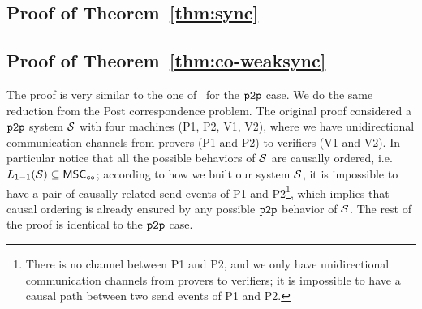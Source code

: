 \subsection{Proof of Theorem~\ref{thm:sync}}
\label{apx:sync}



\subsection{Proof of Theorem~\ref{thm:co-weaksync}}
\label{apx:thm-co-weak-sync}

\thmCoWeakSync*


The proof is very similar to the one of~\cite[Theorem~20]{BolligGFLLS21-long} for the $\mathtt{p2p}$ case. 
We do the same reduction from the Post correspondence problem. 
The original proof considered a $\mathtt{p2p}$ system $\mathcal{S}$ with four machines (P1, P2, V1, V2), where we have 
unidirectional communication channels from provers (P1 and P2) to verifiers (V1 and V2). In particular notice 
that all the possible behaviors of $\mathcal{S}$ are causally ordered, i.e. $L_{1\mathsf{-}1}(\mathcal{S}) \subseteq \mathsf{MSC}_{\mathtt{co}}$; 
according to how we built our system $\mathcal{S}$, it is impossible to have a pair of causally-related send 
events of P1 and P2\footnote{There is no channel between P1 and P2, and we only have unidirectional communication 
channels from provers to verifiers; it is impossible to have a causal path between two send events of P1 and P2.}, which implies that causal ordering is 
already ensured by any possible $\mathtt{p2p}$ behavior of $\mathcal{S}$. The rest of the proof is identical to the 
$\mathtt{p2p}$ case.
